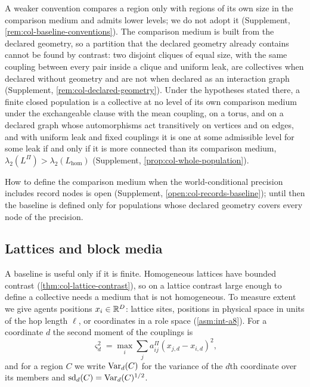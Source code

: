 A weaker convention compares a region only with regions of its own size in the comparison medium and admits lower levels; we do not adopt it (Supplement, \cref{rem:col-baseline-conventions}). The comparison medium is built from the declared geometry, so a partition that the declared geometry already contains cannot be found by contrast: two disjoint cliques of equal size, with the same coupling between every pair inside a clique and uniform leak, are collectives when declared without geometry and are not when declared as an interaction graph (Supplement, \cref{rem:col-declared-geometry}). Under the hypotheses stated there, a finite closed population is a collective at no level of its own comparison medium under the exchangeable clause with the mean coupling, on a torus, and on a declared graph whose automorphisms act transitively on vertices and on edges, and with uniform leak and fixed couplings it is one at some admissible level for some leak if and only if it is more connected than its comparison medium, $\lambda_2(L^\Pi)>\lambda_2(L_{\mathrm{hom}})$ (Supplement, \cref{prop:col-whole-population}).

How to define the comparison medium when the world-conditional precision includes record nodes is open (Supplement, \cref{open:col-records-baseline}); until then the baseline is defined only for populations whose declared geometry covers every node of the precision.

\subsection{Lattices and block media}\label{sec:col-lattice}

A baseline is useful only if it is finite. Homogeneous lattices have bounded contrast (\cref{thm:col-lattice-contrast}), so on a lattice contrast large enough to define a collective needs a medium that is not homogeneous. To measure extent we give agents positions $x_i\in\mathbb{R}^D$: lattice sites, positions in physical space in units of the hop length $\ell$, or coordinates in a role space (\cref{asm:int-a8}). For a coordinate $d$ the second moment of the couplings is
\begin{equation}\label{eq:col-second-moment}
\varsigma_d^2=\max_i\sum_ja^\Pi_{ij}(x_{j,d}-x_{i,d})^2,
\end{equation}
and for a region $C$ we write $\operatorname{Var}_d(C)$ for the variance of the $d$th coordinate over its members and $\operatorname{sd}_d(C)=\operatorname{Var}_d(C)^{1/2}$.

